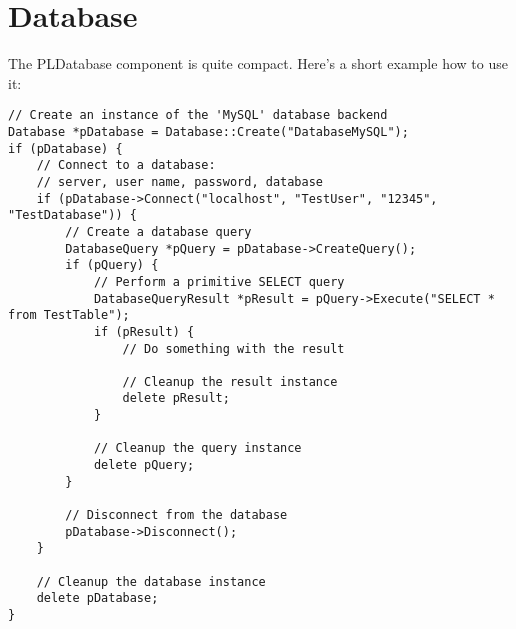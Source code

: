 \section{Database}
The PLDatabase component is quite compact. Here's a short example how to use it:

\begin{lstlisting}[caption=Using the PLDatabase component]
// Create an instance of the 'MySQL' database backend
Database *pDatabase = Database::Create("DatabaseMySQL");
if (pDatabase) {
	// Connect to a database:
	// server, user name, password, database
	if (pDatabase->Connect("localhost", "TestUser", "12345", "TestDatabase")) {
		// Create a database query
		DatabaseQuery *pQuery = pDatabase->CreateQuery();
		if (pQuery) {
			// Perform a primitive SELECT query
			DatabaseQueryResult *pResult = pQuery->Execute("SELECT * from TestTable");
			if (pResult) {
				// Do something with the result

				// Cleanup the result instance
				delete pResult;
			}

			// Cleanup the query instance
			delete pQuery;
		}

		// Disconnect from the database
		pDatabase->Disconnect();
	}

	// Cleanup the database instance
	delete pDatabase;
}
\end{lstlisting}
